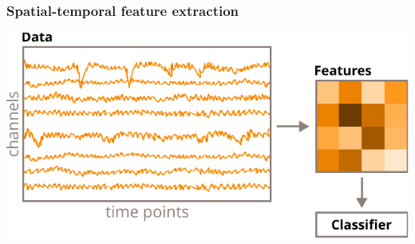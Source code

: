 \documentclass{kul-ulille-beamer}
\begin{document}
\begin{frame}
  \frametitle{Spatial-temporal feature extraction}

  \begin{minipage}[t]{.35\linewidth}
		\centering
  \includegraphics[width=\textwidth]{figures/decode/hoda.pdf}


\end{minipage}
\end{frame}
\end{document}
